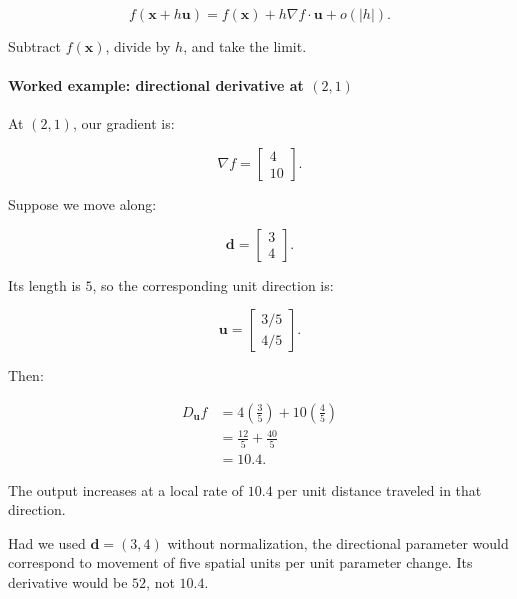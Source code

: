 \[
f(\mathbf x+h\mathbf u) = f(\mathbf x)+h\nabla f\cdot\mathbf u+o(|h|).
\]

Subtract \(f(\mathbf x)\), divide by \(h\), and take the limit.

\begin{allmightroleexample}

\paragraph{\texorpdfstring{Worked example: directional derivative at \((2,1)\)}{Worked example: directional derivative at (2,1)}}\label{02-foundations-ii-ch021-worked-example-directional-derivative-at-21}

\hypertarget{02-foundations-ii-ch021-worked-example-directional-derivative-at-21}{}

At \((2,1)\), our gradient is:

\end{allmightroleexample}

\[
\nabla f= \begin{bmatrix}4\\10\end{bmatrix}.
\]

Suppose we move along:

\[
\mathbf d= \begin{bmatrix}3\\4\end{bmatrix}.
\]

Its length is \(5\), so the corresponding unit direction is:

\[
\mathbf u= \begin{bmatrix}3/5\\4/5\end{bmatrix}.
\]

Then:

\[
\begin{aligned} D_{\mathbf u}f &=4\left(\frac35\right)+10\left(\frac45\right)\\ &=\frac{12}{5}+\frac{40}{5}\\ &=\boxed{10.4}. \end{aligned}
\]

The output increases at a local rate of \(10.4\) per unit distance traveled in that direction.

Had we used \(\mathbf d=(3,4)\) without normalization, the directional parameter would correspond to movement of five spatial units per unit parameter change. Its derivative would be \(52\), not \(10.4\).

